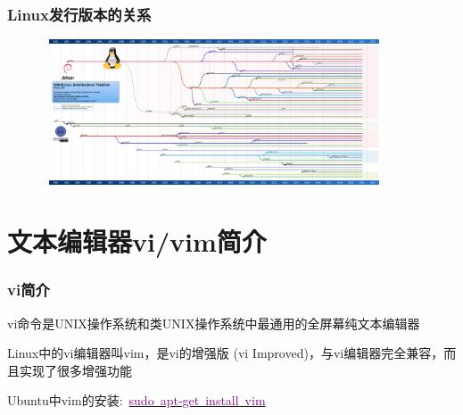 \frame
{
	\frametitle{\textrm{Linux}发行版本的关系}
\begin{figure}[h!]
\centering
\vspace{21.5pt}
\includegraphics[height=1.7in,width=4.0in,viewport=0 0 2400 1080,clip]{Figures/Linux_distro-timeline.png}
\label{Linux-distri-timeline}
\end{figure}
}

\section{文本编辑器\rm{vi/vim}简介}
\frame
{
	\frametitle{\textrm{vi}简介}
	\textrm{vi}命令是\textrm{UNIX}操作系统和类\textrm{UNIX}操作系统中最通用的全屏幕纯文本编辑器

	\textrm{Linux}中的\textrm{vi}编辑器叫\textrm{vim}，是\textrm{vi}的增强版 \textrm{(vi Improved)}，与\textrm{vi}编辑器完全兼容，而且实现了很多增强功能
	
	\textrm{Ubuntu}中\textrm{vim}的安装:~\underline{\textcolor{purple}{sudo~apt-get~install~vim}}
\begin{figure}[h!]
\centering
\vspace*{0.1in}
\label{vim-open}
\end{figure} 
}

